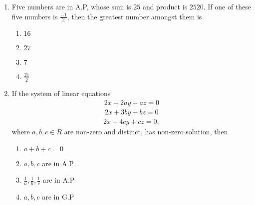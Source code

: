 \documentclass[journal,12pt,twocolumn]{IEEEtran}
\theoremstyle{remark}
\begin{document}
\begin{enumerate}
\begin{multicols}{2}
\end{multicols}
\item Five numbers are in A.P, whose sum is $25$ and product is $2520$. If one of these five numbers is $\frac{-1}{2}$, then the greatest number amongst them is
\begin{multicols}{2}
\begin{enumerate}
    \item $16$
    \item $27$
    \item $7$
    \item $\frac{21}{2}$
\end{enumerate}
\end{multicols}
\item If the system of linear equations
\begin{align*}
    2x+2ay+az=0
\end{align*}
\begin{align*}
    2x+3by+bz=0
\end{align*}
\begin{align*}
    2x+4cy+cz=0,
\end{align*}
where $a,b,c \in R $ are non-zero and distinct, has non-zero solution, then
\begin{multicols}{2}
\begin{enumerate}
    \item $a+b+c=0$
    \item $a,b,c$ are in A.P
    \item $\frac{1}{a},\frac{1}{b},\frac{1}{c}$ are in A.P
    \item $a,b,c$ are in G.P
\end{enumerate}
\end{multicols}
\end{enumerate}
\end{document}
